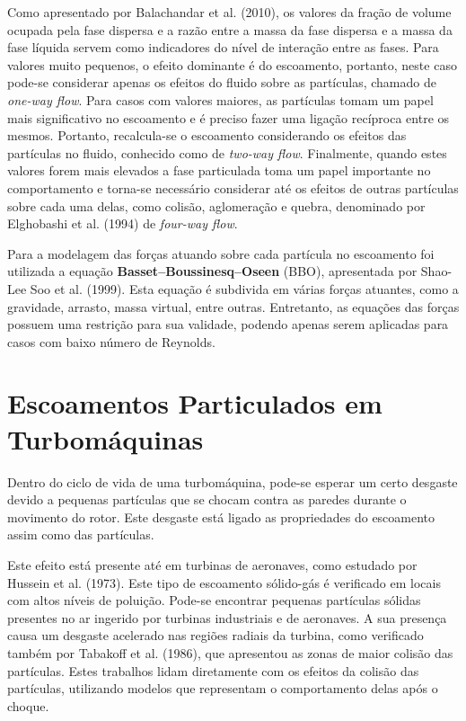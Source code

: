 Como apresentado por Balachandar et al. (2010)\cite{Balachandar-2010}, os valores da fração de volume ocupada pela fase dispersa e a razão entre a massa da fase dispersa e a massa da fase líquida servem como indicadores do nível de interação entre as fases.
Para valores muito pequenos, o efeito dominante é do escoamento, portanto, neste caso pode-se considerar apenas os efeitos do fluido sobre as partículas, chamado de \textit{one-way flow}.
Para casos com valores maiores, as partículas tomam um papel mais significativo no escoamento e é preciso fazer uma ligação recíproca entre os mesmos.
Portanto, recalcula-se o escoamento considerando os efeitos das partículas no fluido, conhecido como de \textit{two-way flow}.
Finalmente, quando estes valores forem mais elevados a fase particulada toma um papel importante no comportamento e torna-se necessário considerar até os efeitos de outras partículas sobre cada uma delas, como colisão, aglomeração e quebra, denominado por Elghobashi et al. (1994)\cite{Elghobashi-1994} de \textit{four-way flow}.

Para a modelagem das forças atuando sobre cada partícula no escoamento foi utilizada a equação \textbf{Basset–Boussinesq–Oseen} (BBO), apresentada por Shao-Lee Soo et al. (1999)\cite{ShaoLeeSoo-1999}.
Esta equação é subdivida em várias forças atuantes, como a gravidade, arrasto, massa virtual, entre outras.
Entretanto, as equações das forças possuem uma restrição para sua validade, podendo apenas serem aplicadas para casos com baixo número de Reynolds.


\section{\textbf{Escoamentos Particulados em Turbomáquinas}}
\label{sec_rev_EP}
Dentro do ciclo de vida de uma turbomáquina, pode-se esperar um certo desgaste devido a pequenas partículas que se chocam contra as paredes durante o movimento do rotor.
Este desgaste está ligado as propriedades do escoamento assim como das partículas.

Este efeito está presente até em turbinas de aeronaves, como estudado por Hussein et al. (1973)\cite{Hussein-1973}.
Este tipo de escoamento sólido-gás é verificado em locais com altos níveis de poluição.
Pode-se encontrar pequenas partículas sólidas presentes no ar ingerido por turbinas industriais e de aeronaves.
A sua presença causa um desgaste acelerado nas regiões radiais da turbina, como verificado também por Tabakoff et al. (1986)\cite{Tabakoff-1986}, que apresentou as zonas de maior colisão das partículas.
Estes trabalhos lidam diretamente com os efeitos da colisão das partículas, utilizando modelos que representam o comportamento delas após o choque.

